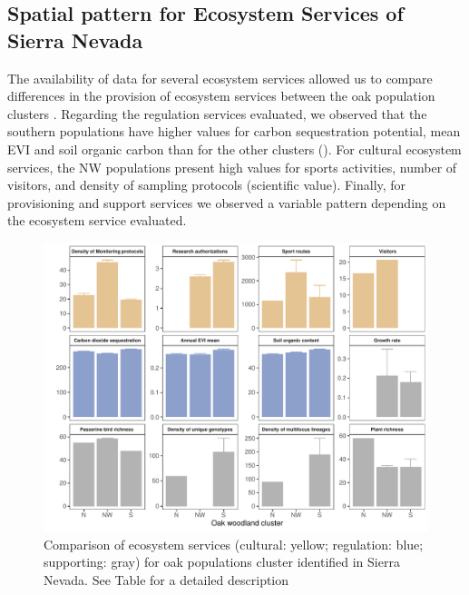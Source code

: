 \subsection{Spatial pattern for Ecosystem Services of Sierra Nevada}\label{sec:es:spatial} 

The availability of data for several ecosystem services allowed us to compare differences in the provision of ecosystem services between the oak population clusters \autocite[N: Northern, NW: Northwestern, and S: Southern; see][]{PerezLuqueetal2021EcologicalDiversity}. Regarding the regulation services evaluated, we observed that the southern populations have higher values for carbon sequestration potential, mean EVI and soil organic carbon than for the other clusters (). For cultural ecosystem services, the NW populations present high values for sports activities, number of visitors, and density of sampling protocols (scientific value). Finally, for provisioning and support services we observed a variable pattern depending on the ecosystem service evaluated. 

\begin{figure}
    \centering
    \includegraphics[width=\textwidth]{img/es/es-plotSN.pdf}\caption{Comparison of ecosystem services (cultural: yellow; regulation: blue; supporting: gray) for oak populations cluster identified in Sierra Nevada. See Table  for a detailed description 
}\label{fig:es:oak-compare}
\end{figure}

